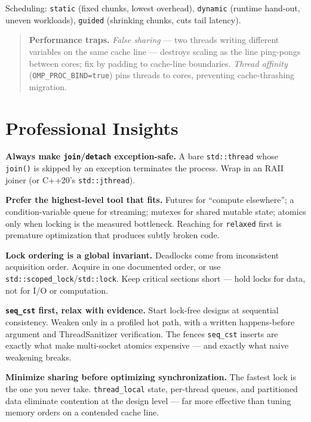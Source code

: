 Scheduling: \texttt{static} (fixed chunks, lowest overhead), \texttt{dynamic} (runtime hand-out, uneven workloads), \texttt{guided} (shrinking chunks, cuts tail latency).

\begin{quote}
\textbf{Performance traps.} \emph{False sharing} --- two threads writing different variables on the same cache line --- destroys scaling as the line ping-pongs between cores; fix by padding to cache-line boundaries. \emph{Thread affinity} (\texttt{OMP\_PROC\_BIND=true}) pins threads to cores, preventing cache-thrashing migration.
\end{quote}

\section{Professional Insights}

\textbf{Always make \texttt{join}/\texttt{detach} exception-safe.} A bare \texttt{std::thread} whose \texttt{join()} is skipped by an exception terminates the process. Wrap in an RAII joiner (or C++20's \texttt{std::jthread}).

\textbf{Prefer the highest-level tool that fits.} Futures for ``compute elsewhere''; a condition-variable queue for streaming; mutexes for shared mutable state; atomics only when locking is the measured bottleneck. Reaching for \texttt{relaxed} first is premature optimization that produces subtly broken code.

\textbf{Lock ordering is a global invariant.} Deadlocks come from inconsistent acquisition order. Acquire in one documented order, or use \texttt{std::scoped\_lock}/\texttt{std::lock}. Keep critical sections short --- hold locks for data, not for I/O or computation.

\textbf{\texttt{seq\_cst} first, relax with evidence.} Start lock-free designs at sequential consistency. Weaken only in a profiled hot path, with a written happens-before argument and ThreadSanitizer verification. The fences \texttt{seq\_cst} inserts are exactly what make multi-socket atomics expensive --- and exactly what naive weakening breaks.

\textbf{Minimize sharing before optimizing synchronization.} The fastest lock is the one you never take. \texttt{thread\_local} state, per-thread queues, and partitioned data eliminate contention at the design level --- far more effective than tuning memory orders on a contended cache line.
